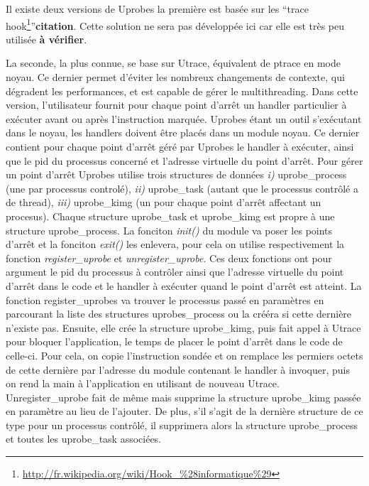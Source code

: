 Il existe deux versions de Uprobes la première est basée sur les ``trace
hook\footnote{\url{http://fr.wikipedia.org/wiki/Hook\_\%28informatique\%29}}''\textbf{{\color{red}citation}}. Cette
solution ne sera pas développée ici car elle est très peu utilisée
\textbf{{\color{red} à vérifier}}.

La seconde, la plus connue, se base sur Utrace, équivalent de ptrace en mode
noyau. Ce dernier permet d'éviter les nombreux changements de contexte, qui
dégradent les performances, et est capable de gérer le multithreading. Dans
cette version, l'utilisateur fournit pour chaque point d'arrêt un handler
particulier à exécuter avant ou après l’instruction marquée. Uprobes étant un
outil s'exécutant dans le noyau, les handlers doivent être placés dans un module
noyau. Ce dernier contient pour chaque point d'arrêt géré par Uprobes le handler
à exécuter, ainsi que le pid du processus concerné et l'adresse virtuelle du
point d'arrêt. Pour gérer un point d'arrêt Uprobes utilise trois structures de
données \textit{i)} uprobe\_process (une par processus controlé), \textit{ii)}
uprobe\_task (autant que le processus contrôlé a de thread), \textit{iii)}
uprobe\_kimg (un pour chaque point d'arrêt affectant un procesus). Chaque
structure uprobe\_task et uprobe\_kimg est propre à une structure
uprobe\_process. La fonciton \textit{init()} du module va poser les points
d'arrêt et la fonciton \textit{exit()} les enlevera, pour cela on utilise
respectivement la fonction \textit{register\_uprobe} et
\textit{unregister\_uprobe}. Ces deux fonctions ont pour argument le pid du
processus à contrôler ainsi que l'adresse virtuelle du point d'arrêt dans le
code et le handler à exécuter quand le point d'arrêt est atteint. La fonction
register\_uprobes va trouver le processus passé en paramètres en parcourant la
liste des structures uprobes\_process ou la crééra si cette dernière n'existe
pas. Ensuite, elle crée la structure uprobe\_kimg, puis fait appel à Utrace pour
bloquer l'application, le temps de placer le point d'arrêt dans le code de
celle-ci. Pour cela, on copie l'instruction sondée et on remplace les permiers
octets de cette dernière par l'adresse du module contenant le handler à
invoquer, puis on rend la main à l'application en utilisant de nouveau Utrace.
Unregister\_uprobe fait de même mais supprime la structure uprobe\_kimg passée
en paramètre au lieu de l'ajouter. De plus, s'il s'agit de la dernière structure
de ce type pour un processus contrôlé, il supprimera alors la structure
uprobe\_process et toutes les uprobe\_task associées.

